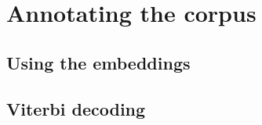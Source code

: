 \section{Annotating the corpus}
\label{sec:annotating}

\subsection{Using the embeddings}
\label{sec:usingembeddings}

\subsection{Viterbi decoding}
\label{sec:viterbidecoding}
